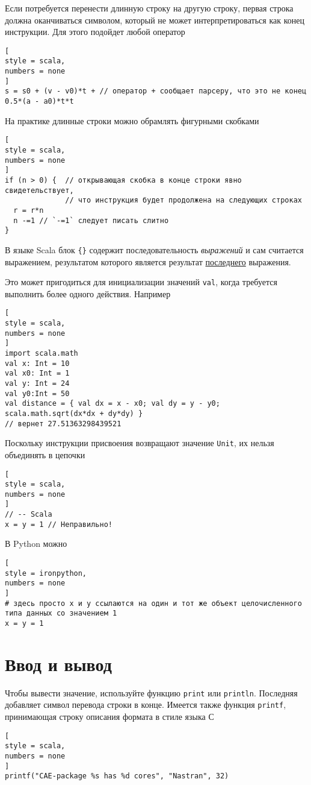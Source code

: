 \documentclass[%
	11pt,
	a4paper,
	utf8,
		]{article}
\begin{document}
Если потребуется перенести длинную строку на другую строку, первая строка должна оканчиваться символом, который не может интерпретироваться как конец инструкции. Для этого подойдет любой оператор
\begin{lstlisting}[
style = scala,
numbers = none
]
s = s0 + (v - v0)*t + // оператор + сообщает парсеру, что это не конец
0.5*(a - a0)*t*t
\end{lstlisting}

На практике длинные строки можно обрамлять фигурными скобками
\begin{lstlisting}[
style = scala,
numbers = none
]
if (n > 0) {  // открывающая скобка в конце строки явно свидетельствует,
              // что инструкция будет продолжена на следующих строках
  r = r*n
  n -=1 // `-=1` следует писать слитно
}
\end{lstlisting}

В языке Scala блок \verb|{}| содержит последовательность \emph{выражений} и сам считается выражением, результатом которого является результат \underline{последнего} выражения.

Это может пригодиться для инициализации значений \texttt{val}, когда требуется выполнить более одного действия. Например
\begin{lstlisting}[
style = scala,
numbers = none
]
import scala.math
val x: Int = 10
val x0: Int = 1
val y: Int = 24
val y0:Int = 50
val distance = { val dx = x - x0; val dy = y - y0; scala.math.sqrt(dx*dx + dy*dy) }
// вернет 27.51363298439521
\end{lstlisting}

Поскольку инструкции присвоения возвращают значение \texttt{Unit}, их нельзя объединять в цепочки
\begin{lstlisting}[
style = scala,
numbers = none
]
// -- Scala
x = y = 1 // Неправильно!
\end{lstlisting}

В Python можно
\begin{lstlisting}[
style = ironpython,
numbers = none
]
# здесь просто x и y ссылаются на один и тот же объект целочисленного типа данных со значением 1
x = y = 1
\end{lstlisting}

\section{Ввод и вывод}

Чтобы вывести значение, используйте функцию \texttt{print} или \texttt{println}. Последняя добавляет символ перевода строки в конце. Имеется также функция \texttt{printf}, принимающая строку описания формата в стиле языка С
\begin{lstlisting}[
style = scala,
numbers = none
]
printf("CAE-package %s has %d cores", "Nastran", 32)
\end{lstlisting}
\end{document}
